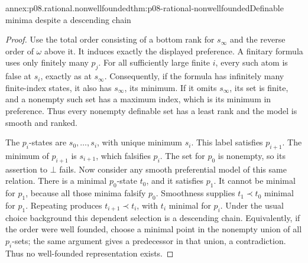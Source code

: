\begin{annexitem}{annex:p08.rational.nonwellfounded}{thm:p08-rational-nonwellfounded}{Definable minima despite a descending chain}
\begin{proof}
Use the total order consisting of a bottom rank for \(s_\infty\)
and the reverse order of \(\omega\) above it. It induces exactly
the displayed preference. A finitary formula uses only finitely many
\(p_j\). For all sufficiently large finite \(i\), every such atom
is false at \(s_i\), exactly as at \(s_\infty\). Consequently,
if the formula has infinitely many finite-index states, it also has
\(s_\infty\), its minimum. If it omits \(s_\infty\), its set
is finite, and a nonempty such set has a maximum index, which is its
minimum in preference. Thus every nonempty definable set has a least
rank and the model is smooth and ranked.

The \(p_i\)-states are \(s_0,\ldots,s_i\), with unique minimum
\(s_i\). This label satisfies \(p_{i+1}\). The minimum of
\(p_{i+1}\) is \(s_{i+1}\), which falsifies \(p_i\).
The set for \(p_0\) is nonempty, so its assertion to \(\bot\)
fails. Now consider any smooth preferential model of this same relation.
There is a minimal \(p_0\)-state \(t_0\), and it satisfies
\(p_1\). It cannot be minimal for \(p_1\), because all those
minima falsify \(p_0\). Smoothness supplies \(t_1\prec t_0\)
minimal for \(p_1\). Repeating produces
\(t_{i+1}\prec t_i\), with \(t_i\) minimal for \(p_i\).
Under the usual choice background this dependent selection is a
descending chain. Equivalently, if the order were well founded,
choose a minimal point in the nonempty union of all \(p_i\)-sets;
the same argument gives a predecessor in that union, a contradiction.
Thus no well-founded representation exists.
\end{proof}
\end{annexitem}

